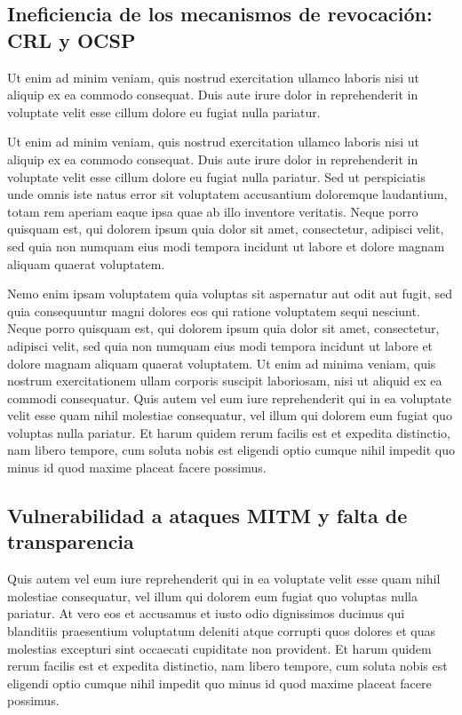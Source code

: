 \subsection{Ineficiencia de los mecanismos de revocación: CRL y OCSP}

Ut enim ad minim veniam, quis nostrud exercitation ullamco laboris nisi ut aliquip ex ea commodo consequat. Duis aute irure dolor in reprehenderit in voluptate velit esse cillum dolore eu fugiat nulla pariatur.

Ut enim ad minim veniam, quis nostrud exercitation ullamco laboris nisi ut aliquip ex ea commodo consequat. Duis aute irure dolor in reprehenderit in voluptate velit esse cillum dolore eu fugiat nulla pariatur. Sed ut perspiciatis unde omnis iste natus error sit voluptatem accusantium doloremque laudantium, totam rem aperiam eaque ipsa quae ab illo inventore veritatis. Neque porro quisquam est, qui dolorem ipsum quia dolor sit amet, consectetur, adipisci velit, sed quia non numquam eius modi tempora incidunt ut labore et dolore magnam aliquam quaerat voluptatem.

Nemo enim ipsam voluptatem quia voluptas sit aspernatur aut odit aut fugit, sed quia consequuntur magni dolores eos qui ratione voluptatem sequi nesciunt. Neque porro quisquam est, qui dolorem ipsum quia dolor sit amet, consectetur, adipisci velit, sed quia non numquam eius modi tempora incidunt ut labore et dolore magnam aliquam quaerat voluptatem. Ut enim ad minima veniam, quis nostrum exercitationem ullam corporis suscipit laboriosam, nisi ut aliquid ex ea commodi consequatur. Quis autem vel eum iure reprehenderit qui in ea voluptate velit esse quam nihil molestiae consequatur, vel illum qui dolorem eum fugiat quo voluptas nulla pariatur. Et harum quidem rerum facilis est et expedita distinctio, nam libero tempore, cum soluta nobis est eligendi optio cumque nihil impedit quo minus id quod maxime placeat facere possimus.

\subsection{Vulnerabilidad a ataques MITM y falta de transparencia}

Quis autem vel eum iure reprehenderit qui in ea voluptate velit esse quam nihil molestiae consequatur, vel illum qui dolorem eum fugiat quo voluptas nulla pariatur. At vero eos et accusamus et iusto odio dignissimos ducimus qui blanditiis praesentium voluptatum deleniti atque corrupti quos dolores et quas molestias excepturi sint occaecati cupiditate non provident. Et harum quidem rerum facilis est et expedita distinctio, nam libero tempore, cum soluta nobis est eligendi optio cumque nihil impedit quo minus id quod maxime placeat facere possimus.

